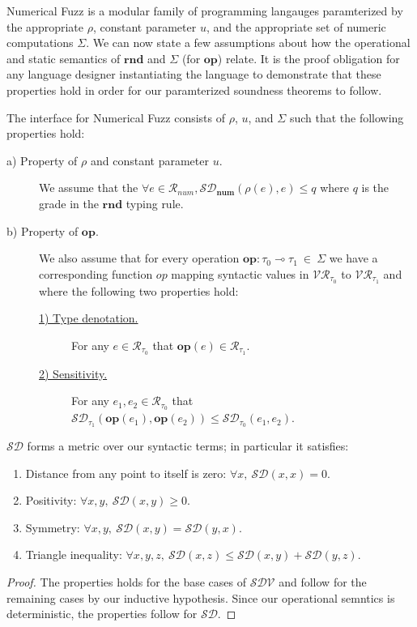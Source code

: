 Numerical Fuzz is a modular family of programming langauges paramterized by the
appropriate $\rho$, constant parameter $u$, and the appropriate set of numeric
computations $\Sigma$.  
We can now state a few assumptions about how the operational and static
semantics of $\mathbf{rnd}$ and $\Sigma$ (for $\mathbf{op}$) relate.
It is the proof obligation for any language designer instantiating the language
to demonstrate that these properties hold in order for our paramterized
soundness theorems to follow.
\begin{definition}
  \label{def:numfuzz-interface}
  The interface for Numerical Fuzz consists of $\rho$, $u$, and $\Sigma$ such
  that the following properties hold: 
\begin{description}
  \item[a) Property of $\rho$ and constant parameter $u$.] We assume that the
    $\forall e \in \mathcal{R}_{num}, \mathcal{SD}_{\mathbf{num}}(\rho(e), e)
    \leq q$ where $q$ is the grade in the $\mathbf{rnd}$ typing rule.
  \item[b) Property of $\mathbf{op}$.] We also assume that for every operation
    $\mathbf{op} : \tau_0 \multimap \tau_1 \ \in \ \Sigma$ we have a
    corresponding function $op$ mapping syntactic values in
    $\mathcal{VR}_{\tau_0}$ to $\mathcal{VR}_{\tau_1}$ and where
    the following two properties hold:
    \begin{description}
      \item[\underline{1) Type denotation.}] For any $e \in
        \mathcal{R}_{\tau_0}$ that $\mathbf{op}(e) \in \mathcal{R}_{\tau_1}$.
      \item[\underline{2) Sensitivity.}] For any $e_1, e_2 \in \mathcal{R}_{\tau_0}$ that
        $\mathcal{SD}_{\tau_1}(\mathbf{op}(e_1), \mathbf{op}(e_2)) \leq
        \mathcal{SD}_{\tau_0}(e_1, e_2)$.
    \end{description}
\end{description}
\end{definition}

\begin{lemma}
  $\mathcal{SD}$ forms a metric over our syntactic terms; in particular it
  satisfies:
  \begin{enumerate}
    \item Distance from any point to itself is zero: $\forall x,~\mathcal{SD}(x,
      x) = 0$.
    \item Positivity: $\forall x, y,~\mathcal{SD}(x, y) \geq 0$.
    \item Symmetry: $\forall x, y,~\mathcal{SD}(x, y) = \mathcal{SD}(y, x)$.
    \item Triangle inequality: $\forall x, y, z,~\mathcal{SD}(x, z) \leq
      \mathcal{SD}(x, y) + \mathcal{SD}(y, z)$.
  \end{enumerate}
\end{lemma}
\begin{proof}
  The properties holds for the base cases of $\mathcal{SDV}$ and follow for the
  remaining cases by our inductive hypothesis. Since our operational semntics is
  deterministic, the properties follow for $\mathcal{SD}$.
\end{proof}

